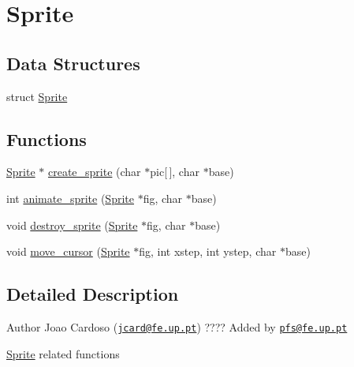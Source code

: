 \hypertarget{group__sprite}{\section{Sprite}
\label{group__sprite}
}
\subsection*{Data Structures}
\begin{DoxyCompactItemize}
\item 
struct \hyperlink{struct_sprite}{Sprite}
\end{DoxyCompactItemize}
\subsection*{Functions}
\begin{DoxyCompactItemize}
\item 
\hyperlink{struct_sprite}{Sprite} $\ast$ \hyperlink{group__sprite_ga445dc6cc26348e60c1403ff892186244}{create\-\_\-sprite} (char $\ast$pic\mbox{[}$\,$\mbox{]}, char $\ast$base)
\item 
int \hyperlink{group__sprite_gab2de76a7d168882434343bd1a3a6d69d}{animate\-\_\-sprite} (\hyperlink{struct_sprite}{Sprite} $\ast$fig, char $\ast$base)
\item 
void \hyperlink{group__sprite_ga6d8a948f0e7c3a53ce5645d8f82c9082}{destroy\-\_\-sprite} (\hyperlink{struct_sprite}{Sprite} $\ast$fig, char $\ast$base)
\item 
void \hyperlink{group__sprite_ga5c0da2e39973a2e7103cc833bb5b827f}{move\-\_\-cursor} (\hyperlink{struct_sprite}{Sprite} $\ast$fig, int xstep, int ystep, char $\ast$base)
\end{DoxyCompactItemize}


\subsection{Detailed Description}
\begin{DoxyAuthor}{Author}
Joao Cardoso (\href{mailto:jcard@fe.up.pt}{\tt jcard@fe.\-up.\-pt}) ???? Added by \href{mailto:pfs@fe.up.pt}{\tt pfs@fe.\-up.\-pt}
\end{DoxyAuthor}
\hyperlink{struct_sprite}{Sprite} related functions 

